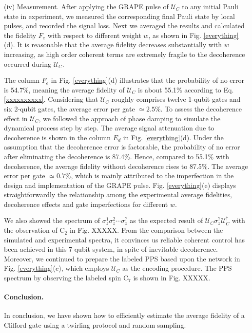 \documentclass[prl,twocolumn,showpacs]{revtex4-1}
\begin{document}
(iv) Measurement. After applying the GRAPE pulse of $\mathcal{U}_{C}$ to any initial Pauli state in experiment, we measured the corresponding final Pauli state by local pulses, and recorded the signal loss.  Next we averaged the results and calculated the fidelity $F_e$ with respect to different weight $w$, as shown in Fig. \ref{everything}(d). It is reasonable that the average fidelity decreases substantially with $w$ increasing, as 
high order coherent terms are extremely fragile to the decoherence occurred during $\mathcal{U}_{C}$. 

The column $F_e$ in Fig. \ref{everything}(d) illustrates that the probability of no error is 54.7\%, meaning the average fidelity of $\mathcal{U}_{C}$ is about 55.1\% according to Eq. \ref{xxxxxxxxxx}. Considering that  $\mathcal{U}_{C}$ roughly comprises twelve 1-qubit gates and six 2-qubit gates, the average error per gate $\simeq 2.5\%$. To assess the decoherence effect in $\mathcal{U}_{C}$, we followed the approach of phase damping \cite{Vandersypen2001} to simulate the dynamical process step by step. The average signal attenuation due to decoherence is shown in the column $E_d$ in Fig. \ref{everything}(d). Under the assumption that the decoherence error is factorable, the probability of no error after eliminating the decoherence is 87.4\%. Hence, compared to 55.1\% with decoherence, the average fidelity without decoherence rises to 87.5\%. The average error per gate $\simeq 0.7\%$, which is mainly attributed to the imperfection in the design and implementation of the GRAPE pulse.  Fig. \ref{everything}(e) displays straightforwardly the relationship among the experimental average fidelities, decoherence effects and gate imperfections for different $w$. 

We also showed the spectrum of $\sigma^1_z\sigma^2_z\cdots \sigma^7_z$ as the expected result of $\mathcal{U}_{C} \sigma^7_z \mathcal{U}_{C}^{\dagger}$ with the observation of C$_2$ in Fig. XXXXX. From the comparison between the simulated and experimental spectra, it convinces us reliable coherent control has been achieved in this 7-qubit system, in spite of inevitable decoherence.  Moreover, we continued to prepare the labeled PPS based upon the network in Fig. \ref{everything}(c), which employs $\mathcal{U}_{C}$ as the encoding procedure. The PPS spectrum by observing the labeled spin C$_7$ is shown in Fig. XXXXX.

\paragraph*{Conclusion.}
In conclusion, we have shown how to efficiently estimate the average fidelity of a Clifford gate using a twirling protocol and random sampling. 
\end{document}
